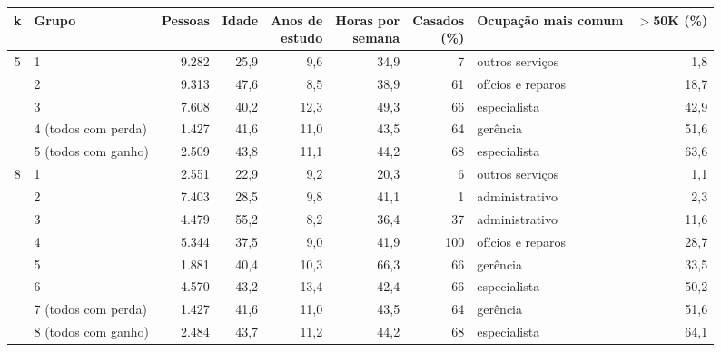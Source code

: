 \setlength{\tabcolsep}{3pt}
\begin{tabular}{clrrrrrlr}
\toprule
k & Grupo & Pessoas & Idade & \shortstack{Anos de\\estudo} & \shortstack{Horas por\\semana} & \shortstack{Casados\\(\%)} & Ocupação mais comum & \shortstack{$>$50K\\(\%)} \\
\midrule
5 & 1 & 9.282 & 25,9 & 9,6 & 34,9 & 7 & outros serviços & 1,8 \\
 & 2 & 9.313 & 47,6 & 8,5 & 38,9 & 61 & ofícios e reparos & 18,7 \\
 & 3 & 7.608 & 40,2 & 12,3 & 49,3 & 66 & especialista & 42,9 \\
 & 4 (todos com perda) & 1.427 & 41,6 & 11,0 & 43,5 & 64 & gerência & 51,6 \\
 & 5 (todos com ganho) & 2.509 & 43,8 & 11,1 & 44,2 & 68 & especialista & 63,6 \\
\midrule
8 & 1 & 2.551 & 22,9 & 9,2 & 20,3 & 6 & outros serviços & 1,1 \\
 & 2 & 7.403 & 28,5 & 9,8 & 41,1 & 1 & administrativo & 2,3 \\
 & 3 & 4.479 & 55,2 & 8,2 & 36,4 & 37 & administrativo & 11,6 \\
 & 4 & 5.344 & 37,5 & 9,0 & 41,9 & 100 & ofícios e reparos & 28,7 \\
 & 5 & 1.881 & 40,4 & 10,3 & 66,3 & 66 & gerência & 33,5 \\
 & 6 & 4.570 & 43,2 & 13,4 & 42,4 & 66 & especialista & 50,2 \\
 & 7 (todos com perda) & 1.427 & 41,6 & 11,0 & 43,5 & 64 & gerência & 51,6 \\
 & 8 (todos com ganho) & 2.484 & 43,7 & 11,2 & 44,2 & 68 & especialista & 64,1 \\
\bottomrule
\end{tabular}
